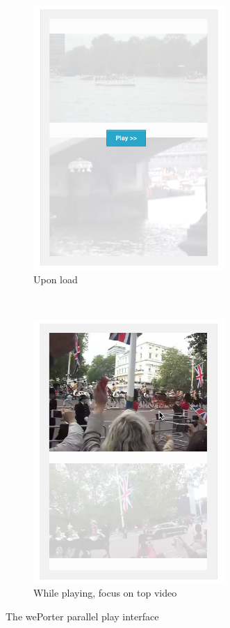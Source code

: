 \begin{figure}
  \centering
  \begin{subfigure}[b]{.5\textwidth}
          \centering
          \includegraphics[height=10cm]{img/pplay1}
          \vfil
          \caption{Upon load}
          \label{fig:pplay1}
  \end{subfigure}%
  ~
  \begin{subfigure}[b]{.5\textwidth}
          \centering
          \includegraphics[height=10cm]{img/pplay2_cursor}
          \vfil
          \caption{While playing, focus on top video}
          \label{fig:pplay2}
  \end{subfigure}
  \caption{The wePorter parallel play interface}\label{fig:interface}
\end{figure}


